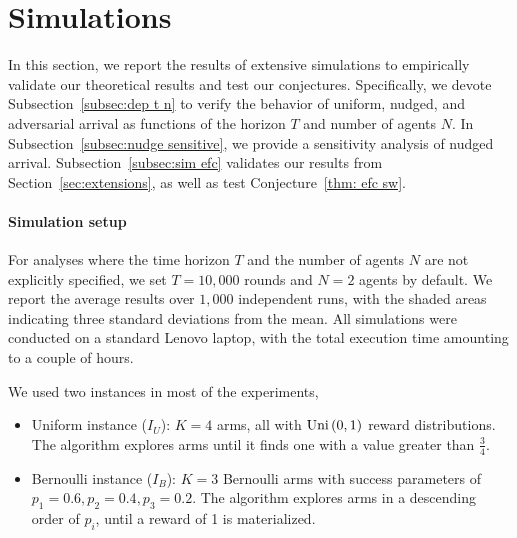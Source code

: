 \section{Simulations}
\label{sec:simulations}
\newcommand{\uins}{I_U}
\newcommand{\bins}{I_B}
\newcommand{\sins}{I_S}
In this section, we report the results of extensive simulations to empirically validate our theoretical results and test our conjectures. Specifically, we devote Subsection~\ref{subsec:dep t n} to verify the behavior of uniform, nudged, and adversarial arrival as functions of the horizon $T$ and number of agents $N$. In Subsection~\ref{subsec:nudge sensitive}, we provide a sensitivity analysis of nudged arrival. Subsection~\ref{subsec:sim efc} validates our results from Section~\ref{sec:extensions}, as well as test Conjecture~\ref{thm: efc sw}.

\paragraph{Simulation setup}
For analyses where the time horizon $T$ and the number of agents $N$ are not explicitly specified, we set $T = 10{,}000$ rounds and $N=2$ agents by default. We report the average results over $1{,}000$ independent runs, with the shaded areas indicating three standard deviations from the mean. All simulations were conducted on a standard Lenovo laptop, with the total execution time amounting to a couple of hours.

We used two instances in most of the experiments, 
\begin{itemize}
    \item Uniform instance ($\uins$): $K=4$ arms, all with $\text{Uni}\left(0,1\right)$ reward distributions. The algorithm explores arms until it finds one with a value greater than $\frac{3}{4}$. 
    \item Bernoulli instance ($\bins$): $K=3$ Bernoulli arms with success parameters of $p_1 = 0.6, p_2=0.4, p_3=0.2$. The algorithm explores arms in a descending order of $p_i$, until a reward of 1 is materialized.
\end{itemize}

